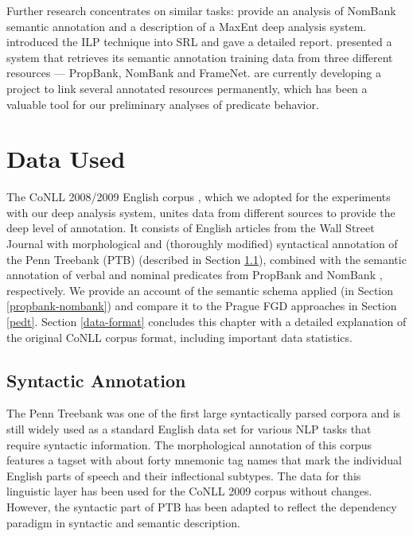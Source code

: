 \documentclass[12pt,notitlepage]{report}
\begin{document}
Further research concentrates on similar tasks: \citet{jiang06} provide an analysis of NomBank \citep{meyers04} semantic annotation and a description of a MaxEnt deep analysis system. \citet{punyakanok04} introduced the ILP technique into SRL and gave a detailed report. \citet{giuglea06} presented a system that retrieves its semantic annotation training data from three different resources --- PropBank, NomBank and FrameNet. \citet{loper07} are currently developing a project to link several annotated resources permanently, which has been a valuable tool for our preliminary analyses of predicate behavior. 

%
%
\chapter{Data Used}\label{data}
%
%

The CoNLL 2008/2009 English corpus \citep{surdeanu08,hajic09}, which we adopted for the experiments with our deep analysis system, unites data from different sources to provide the deep level of annotation. It consists of English articles from the Wall Street Journal with morphological and (thoroughly modified) syntactical annotation of the Penn Treebank (PTB) \citep{marcus93} (described in Section \ref{synt-annot}), combined with the semantic annotation of verbal and nominal predicates from PropBank \citep{palmer05} and NomBank \citep{meyers04}, respectively. We provide an account of the semantic schema applied (in Section \ref{propbank-nombank}) and compare it to the Prague FGD approaches in Section \ref{pedt}. Section \ref{data-format} concludes this chapter with a detailed explanation of the original CoNLL corpus format, including important data statistics.

\section{Syntactic Annotation}\label{synt-annot}

The Penn Treebank was one of the first large syntactically parsed corpora and is still widely used as a standard English data set for various NLP tasks that require syntactic information. The morphological annotation of this corpus features a tagset \citep{santorini90} with about forty mnemonic tag names that mark the individual English parts of speech and their inflectional subtypes. The data for this linguistic layer has been used for the CoNLL 2009 corpus without changes. However, the syntactic part of PTB has been adapted to reflect the dependency paradigm in syntactic and semantic description.
\end{document}
